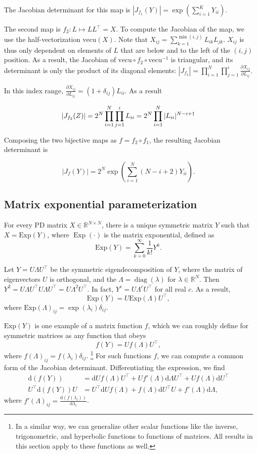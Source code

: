 \documentclass[11pt]{article}
\newcommand{\abs}[1]{\left| #1 \right|}
\newcommand{\absdet}[1]{\abs{#1}}
\newcommand{\dv}[1]{\mathrm{d}{#1}}
\newcommand{\Exp}{\mathrm{Exp}}
\newcommand{\vectu}{\mathrm{vecu}}
\begin{document}
The Jacobian determinant for this map is $\absdet{J_{f_1}(Y)} = \exp(\sum_{i=1}^K Y_{ii})$.

The second map is $f_2: L \mapsto L L^\top = X$.
To compute the Jacobian of the map, we use the half-vectorization $\vectu(X)$.
Note that $X_{ij} = \sum_{k=1}^{\min(i, j)} L_{ik} L_{jk}$.
$X_{ij}$ is thus only dependent on elements of $L$ that are below and to the left of the $(i, j)$ position.
As a result, the Jacobian of $\vectu \circ f_2 \circ \vectu^{-1}$ is triangular, and its determinant is only the product of its diagonal elements: $\absdet{J_{f_2}} = \prod_{i=1}^N \prod_{j=1}^i \frac{\partial X_{ij}}{\partial L_{ij}}$.

In this index range, $\frac{\partial X_{ij}}{\partial L_{ij}} = (1 + \delta_{ij}) L_{ii}$.
As a result

\[
  \absdet{J_{f_2}(Z)} = 2^N \prod_{i = 1}^N \prod_{j = 1}^i L_{ii} = 2^N \prod_{i=1}^N |L_{ii}|^{N - i + 1} \\
\]

Composing the two bijective maps as $f = f_2 \circ f_1$, the resulting Jacobian determinant is

\[
  \absdet{J_{f}(Y)} = 2^N \exp\left( \sum_{i=1}^N (N - i + 2) Y_{ii}\right).
\]

\subsection{Matrix exponential parameterization}

For every PD matrix $X \in \mathbb{R}^{N \times N}$, there is a unique symmetric matrix $Y$ such that $X = \Exp(Y)$, where $\operatorname{Exp}(\cdot)$ is the matrix exponential, defined as
\[\Exp(Y) = \sum_{k=0}^\infty \frac{1}{k!} Y^k.\]

Let $Y = U \Lambda U^\top$ be the symmetric eigendecomposition of $Y$, where the matrix of eigenvectors $U$ is orthogonal, and the $\Lambda = \operatorname{diag}(\lambda)$ for $\lambda \in \mathbb{R}^N$.
Then $Y^2 = U \Lambda U^\top U \Lambda U^\top = U \Lambda^2 U^\top$.
In fact, $Y^c = U \Lambda^c U^\top$ for all real $c$.
As a result,
\[\Exp(Y) = U \Exp(\Lambda) U^\top,\]
where $\Exp(\Lambda)_{ij} = \exp(\lambda_i) \delta_{ij}$.

$\Exp(Y)$ is one example of a matrix function $f$, which we can roughly define for symmetric matrices as any function that obeys
\[f(Y) = U f(\Lambda) U^\top,\]
where $f(\Lambda)_{ij} = f(\lambda_i)\delta_{ij}$.
\footnote{
  In a similar way, we can generalize other scalar functions like the inverse, trigonometric, and hyperbolic functions to functions of matrices.
  All results in this section apply to these functions as well.
}
For such functions $f$, we can compute a common form of the Jacobian determinant.
Differentiating the expression, we find
\[
\begin{aligned}
  \dv{(f(Y))} &= \dv{U} f(\Lambda) U^\top + U f'(\Lambda) \dv{\Lambda} U^\top + U f(\Lambda) \dv{U}^\top\\
  U^\top \dv{(f(Y))} U &= U^\top \dv{U} f(\Lambda) + f(\Lambda) \dv{U}^\top U + f'(\Lambda)\dv{\Lambda},
\end{aligned}
\]
where $f'(\Lambda)_{ij} = \frac{\dv{(f(\lambda_i))}}{\dv{\lambda_i}}$.
\end{document}
